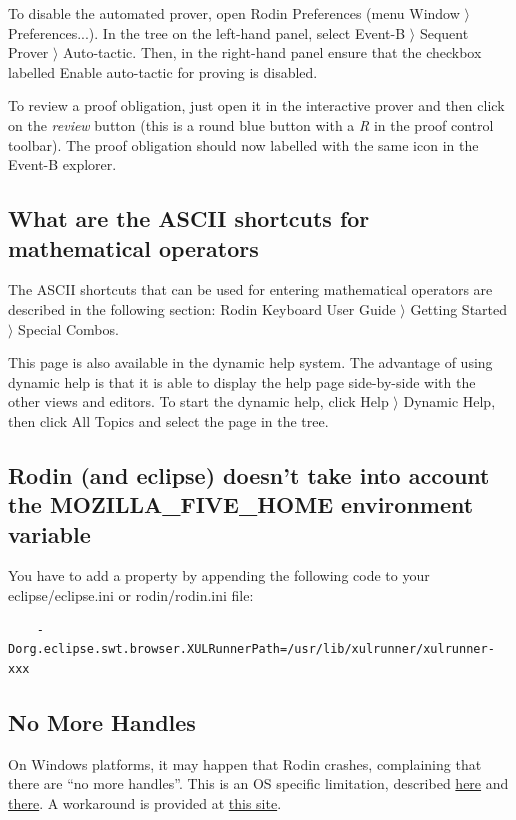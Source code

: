 To disable the automated prover, open \textsf{Rodin Preferences} 
(menu \textsf{Window $\rangle$ Preferences...}). In the tree on the left-hand panel, select \textsf{Event-B $\rangle$ Sequent Prover $\rangle$ Auto-tactic}. Then, in the right-hand panel ensure that the checkbox labelled \textsf{Enable auto-tactic} for proving is disabled. 

To review a proof obligation, just open it in the interactive prover and then click on the \emph{review} button (this is a round blue button with a \emph{R} in the proof control toolbar). The proof obligation should now labelled with the same icon in the Event-B explorer. 

\subsection{What are the ASCII shortcuts for mathematical operators}

The ASCII shortcuts that can be used for entering mathematical operators are described in the following section: \textsf{Rodin Keyboard User Guide $\rangle$ Getting Started $\rangle$ Special Combos}. 

This page is also available in the dynamic help system. The advantage of using dynamic help is that it is able to display the help page side-by-side with the other views and editors. To start the dynamic help, click \textsf{Help $\rangle$ Dynamic Help}, then click \textsf{All Topics} and select the page in the tree. 

\subsection{Rodin (and eclipse) doesn't take into account the MOZILLA\_FIVE\_HOME environment variable}

You have to add a property by appending the following code to your \textsf{eclipse/eclipse.ini} or \textsf{rodin/rodin.ini} file: 

\begin{verbatim} 
	-Dorg.eclipse.swt.browser.XULRunnerPath=/usr/lib/xulrunner/xulrunner-xxx 
\end{verbatim} 

\subsection{No More Handles}

On Windows platforms, it may happen that Rodin crashes, complaining that there are ``no more handles''. This is an OS specific limitation, described \href{http://journals.jevon.org/users/jevon-phd/entry/19833}{here} and \href{https://bugs.eclipse.org/bugs/show_bug.cgi?id=211124}{there}. A workaround is provided at \href{http://blogs.msdn.com/b/ntdebugging/archive/2007/01/04/desktop-heap-overview.aspx}{this site}. 

